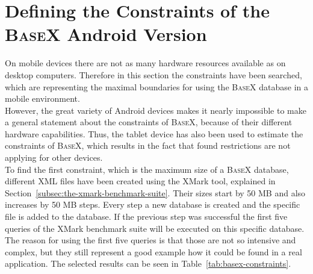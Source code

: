 \section{Defining the Constraints of the \textsc{BaseX} Android Version}
\label{sec:defining-the-constraints}
On mobile devices there are not as many hardware resources available as on desktop computers.
Therefore in this section the constraints have been searched, which are representing the maximal boundaries for using the \textsc{BaseX} database in a mobile environment.\\
However, the great variety of Android devices makes it nearly impossible to make a general statement about the constraints of \textsc{BaseX}, because of their different hardware capabilities.
Thus, the tablet device has also been used to estimate the constraints of \textsc{BaseX}, which results in the fact that found restrictions are not applying for other devices.\\
To find the first constraint, which is the maximum size of a \textsc{BaseX} database, different XML files have been created using the XMark tool, explained in Section~\ref{subsec:the-xmark-benchmark-suite}.
Their sizes start by 50 MB and also increases by 50 MB steps.
Every step a new database is created and the specific file is added to the database.
If the previous step was successful the first five queries of the XMark benchmark suite will be executed on this specific database.
The reason for using the first five queries is that those are not so intensive and complex, but they still represent a good example how it could be found in a real application.
The selected results can be seen in Table~\ref{tab:basex-constraints}.

